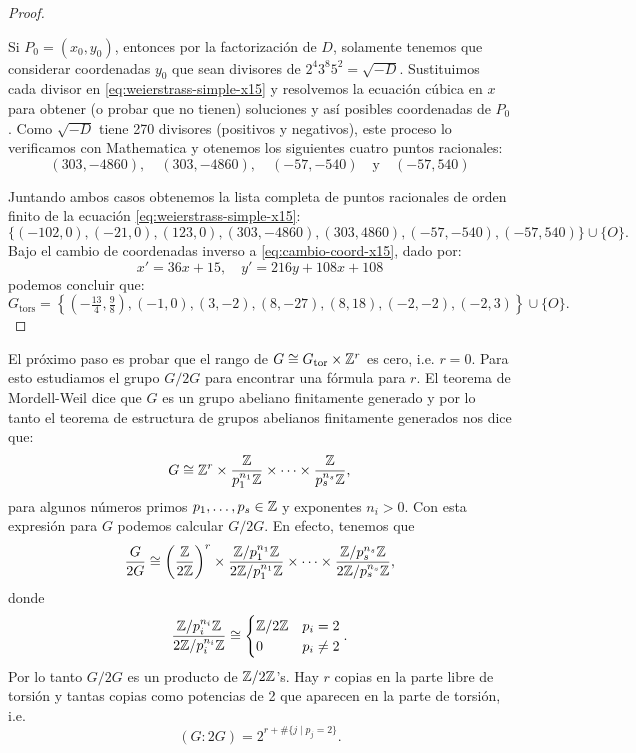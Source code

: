 \documentclass[../../tesis_maestria]{subfiles}
\begin{document}
\begin{proof}
\begin{enumerate}
	Si $P_0=(x_0,y_0)$, entonces por la factorización de $D$, solamente tenemos que considerar coordenadas $y_0$ que sean divisores de $2^4 3^8 5^2=\sqrt{-D}$. Sustituimos cada divisor en \eqref{eq:weierstrass-simple-x15} y resolvemos la ecuación cúbica en $x$ para obtener (o probar que no tienen) soluciones y así posibles coordenadas de $P_0$. Como $\sqrt{-D}$ tiene 270 divisores (positivos y negativos), este proceso lo verificamos con Mathematica y otenemos los siguientes cuatro puntos racionales:
	\[
		(303,-4860),\quad (303,-4860),\quad (-57,-540)\quad\text{y}\quad (-57,540)
	\]
\end{enumerate}

Juntando ambos casos obtenemos la lista completa de puntos racionales de orden finito de la ecuación \eqref{eq:weierstrass-simple-x15}:
\[
	\{(-102,0),(-21,0),(123,0),(303,-4860),(303,4860),(-57,-540),(-57,540)\}\cup\{O\}.
\]
Bajo el cambio de coordenadas inverso a \eqref{eq:cambio-coord-x15}, dado por:
\[
	x'=36x+15,\quad y'=216y+108x+108
\]
podemos concluir que:
	\[
		G_\mathrm{tors}=
		\left\{ \left(-\tfrac{13}{4},\tfrac{9}{8}\right),(-1,0),(3,-2),(8,-27),(8,18),(-2,-2),(-2,3) \right\}\cup\{O\}.
	\]
\end{proof}

El próximo paso es probar que el rango de $G\cong G_\mathrm{tor}\times\mathbb{Z}^r$ es cero, i.e. $r=0$. Para esto estudiamos el grupo $G/2G$ para encontrar una fórmula para $r$. El teorema de Mordell-Weil dice que $G$ es un grupo abeliano finitamente generado y por lo tanto el teorema de estructura de grupos abelianos finitamente generados nos dice que:
\[
	G\cong\mathbb{Z}^r\times\frac{\mathbb{Z}}{p_1^{n_1}\mathbb{Z}}\times\cdots\times\frac{\mathbb{Z}}{p_s^{n_s}\mathbb{Z}},
\]
para algunos números primos $p_1,\ldots,p_s\in\mathbb{Z}$ y exponentes $n_i>0$. Con esta expresión para $G$ podemos calcular $G/2G$. En efecto, tenemos que
\[
	\frac{G}{2G}\cong\left(\frac{\mathbb{Z}}{2\mathbb{Z}}\right)^r\times\frac{\mathbb{Z}/p_1^{n_1}\mathbb{Z}}{2\mathbb{Z}/p_1^{n_1}\mathbb{Z}}\times\cdots\times\frac{\mathbb{Z}/p_s^{n_s}\mathbb{Z}}{2\mathbb{Z}/p_s^{n_s}\mathbb{Z}},
\]
donde
\[
	\frac{\mathbb{Z}/p_i^{n_i}\mathbb{Z}}{2\mathbb{Z}/p_i^{n_i}\mathbb{Z}}\cong
	\begin{cases}
	\mathbb{Z}/2\mathbb{Z} & p_i=2\\
	0 & p_i\neq 2
	\end{cases}.
\]
Por lo tanto $G/2G$ es un producto de $\mathbb{Z}/2\mathbb{Z}$'s. Hay $r$ copias en la parte libre de torsión y tantas copias como potencias de 2 que aparecen en la parte de torsión, i.e.
\begin{equation}\label{eq:indice-G-2G-inicial}
	(G:2G)=2^{r+\#\{j\mid p_j=2\}}.
\end{equation}
\end{document}
